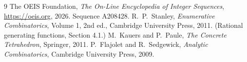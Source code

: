 \documentclass[11pt,a4paper]{article}
\theoremstyle{plain}
\theoremstyle{definition}
\begin{document}
\begin{thebibliography}{9}
 The OEIS Foundation, \emph{The On-Line Encyclopedia of Integer
Sequences}, \url{https://oeis.org}, 2026. Sequence A208428.
 R.~P.~Stanley, \emph{Enumerative Combinatorics}, Volume 1, 2nd ed.,
Cambridge University Press, 2011. (Rational generating functions, Section 4.1.)
 M.~Kauers and P.~Paule, \emph{The Concrete Tetrahedron}, Springer, 2011.
 P.~Flajolet and R.~Sedgewick, \emph{Analytic Combinatorics}, Cambridge
University Press, 2009.
\end{thebibliography}
\end{document}
